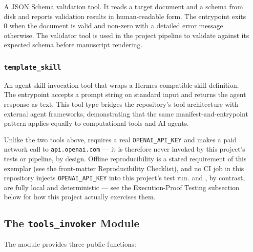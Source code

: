 \documentclass[
]{article}
\begin{document}
A JSON Schema validation tool. It reads a target document and a schema
from disk and reports validation results in human-readable form. The
entrypoint  exits 0 when the document is
valid and non-zero with a detailed error message otherwise. The
validator tool is used in the project pipeline to validate
 against its expected schema before
manuscript rendering.

\subsubsection{\texorpdfstring{\texttt{template\_skill}}{template_skill}}\label{template_skill}

An agent skill invocation tool that wraps a Hermes-compatible skill
definition. The entrypoint  accepts a prompt
string on standard input and returns the agent response as text. This
tool type bridges the repository's tool architecture with external agent
frameworks, demonstrating that the same manifest-and-entrypoint pattern
applies equally to computational tools and AI agents.

Unlike the two tools above,  requires a real
\texttt{OPENAI\_API\_KEY} and makes a paid network call to
\texttt{api.openai.com} --- it is therefore never invoked by this
project's tests or pipeline, by design. Offline reproducibility is a
stated requirement of this exemplar (see the front-matter
Reproducibility Checklist), and no CI job in this repository injects
\texttt{OPENAI\_API\_KEY} into this project's test run.
 and , by
contrast, are fully local and deterministic --- see the Execution-Proof
Testing subsection below for how this project actually exercises them.

\subsection{\texorpdfstring{The \texttt{tools\_invoker}
Module}{The tools_invoker Module}}\label{the-tools_invoker-module}

The  module provides three public
functions:
\end{document}
